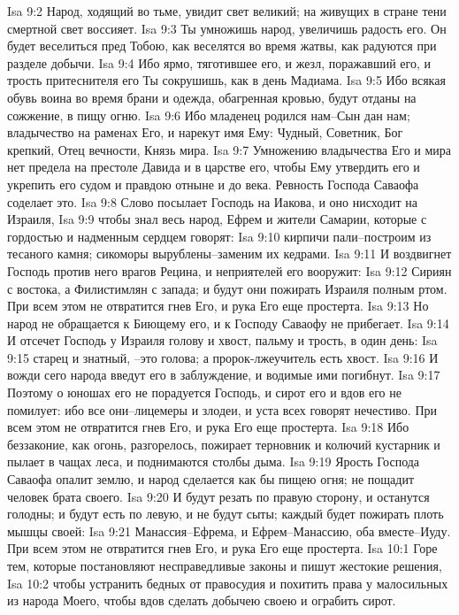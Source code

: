 Isa 9:2  Народ, ходящий во тьме, увидит свет великий; на живущих в стране тени смертной свет воссияет.
Isa 9:3  Ты умножишь народ, увеличишь радость его. Он будет веселиться пред Тобою, как веселятся во время жатвы, как радуются при разделе добычи.
Isa 9:4  Ибо ярмо, тяготившее его, и жезл, поражавший его, и трость притеснителя его Ты сокрушишь, как в день Мадиама.
Isa 9:5  Ибо всякая обувь воина во время брани и одежда, обагренная кровью, будут отданы на сожжение, в пищу огню.
Isa 9:6  Ибо младенец родился нам--Сын дан нам; владычество на раменах Его, и нарекут имя Ему: Чудный, Советник, Бог крепкий, Отец вечности, Князь мира.
Isa 9:7  Умножению владычества Его и мира нет предела на престоле Давида и в царстве его, чтобы Ему утвердить его и укрепить его судом и правдою отныне и до века. Ревность Господа Саваофа соделает это.
Isa 9:8  Слово посылает Господь на Иакова, и оно нисходит на Израиля,
Isa 9:9  чтобы знал весь народ, Ефрем и жители Самарии, которые с гордостью и надменным сердцем говорят:
Isa 9:10  кирпичи пали--построим из тесаного камня; сикоморы вырублены--заменим их кедрами.
Isa 9:11  И воздвигнет Господь против него врагов Рецина, и неприятелей его вооружит:
Isa 9:12  Сириян с востока, а Филистимлян с запада; и будут они пожирать Израиля полным ртом. При всем этом не отвратится гнев Его, и рука Его еще простерта.
Isa 9:13  Но народ не обращается к Биющему его, и к Господу Саваофу не прибегает.
Isa 9:14  И отсечет Господь у Израиля голову и хвост, пальму и трость, в один день:
Isa 9:15  старец и знатный, --это голова; а пророк-лжеучитель есть хвост.
Isa 9:16  И вожди сего народа введут его в заблуждение, и водимые ими погибнут.
Isa 9:17  Поэтому о юношах его не порадуется Господь, и сирот его и вдов его не помилует: ибо все они--лицемеры и злодеи, и уста всех говорят нечестиво. При всем этом не отвратится гнев Его, и рука Его еще простерта.
Isa 9:18  Ибо беззаконие, как огонь, разгорелось, пожирает терновник и колючий кустарник и пылает в чащах леса, и поднимаются столбы дыма.
Isa 9:19  Ярость Господа Саваофа опалит землю, и народ сделается как бы пищею огня; не пощадит человек брата своего.
Isa 9:20  И будут резать по правую сторону, и останутся голодны; и будут есть по левую, и не будут сыты; каждый будет пожирать плоть мышцы своей:
Isa 9:21  Манассия--Ефрема, и Ефрем--Манассию, оба вместе--Иуду. При всем этом не отвратится гнев Его, и рука Его еще простерта.
Isa 10:1  Горе тем, которые постановляют несправедливые законы и пишут жестокие решения,
Isa 10:2  чтобы устранить бедных от правосудия и похитить права у малосильных из народа Моего, чтобы вдов сделать добычею своею и ограбить сирот.

